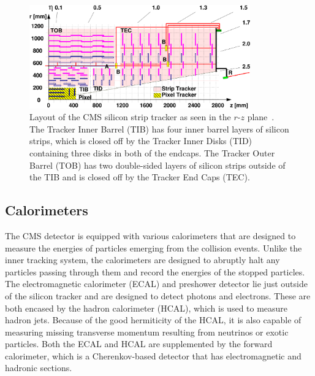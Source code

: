 \begin{figure}[htbp]
  \centering
  \includegraphics[width=0.85\textwidth]{fig/experiment/cms_siliconTracker.pdf}
  \caption[
    Layout of the CMS silicon strip tracker as seen in the $r$-$z$ plane.
    The Tracker Inner Barrel (TIB) has four inner barrel layers of silicon strips, which is closed off by the Tracker Inner Disks (TID) containing three disks in both of the endcaps.
    The Tracker Outer Barrel (TOB) has two double-sided layers of silicon strips outside of the TIB and is closed off by the Tracker End Caps (TEC).
  ]{
    Layout of the CMS silicon strip tracker as seen in the $r$-$z$ plane~\cite{Chatrchyan:1211825}.
    The Tracker Inner Barrel (TIB) has four inner barrel layers of silicon strips, which is closed off by the Tracker Inner Disks (TID) containing three disks in both of the endcaps.
    The Tracker Outer Barrel (TOB) has two double-sided layers of silicon strips outside of the TIB and is closed off by the Tracker End Caps (TEC).
  }
  \label{fig:CMSsilicon}
\end{figure}

\subsection{Calorimeters}
\label{subsec:calorimeter}

The CMS detector is equipped with various calorimeters that are designed to measure the energies of particles emerging from the collision events.
Unlike the inner tracking system, the calorimeters are designed to abruptly halt any particles passing through them and record the energies of the stopped particles.
The electromagnetic calorimeter (ECAL) and preshower detector lie just outside of the silicon tracker and are designed to detect photons and electrons.
These are both encased by the hadron calorimeter (HCAL), which is used to measure hadron jets.
Because of the good hermiticity of the HCAL, it is also capable of measuring missing transverse momentum resulting from neutrinos or exotic particles.
Both the ECAL and HCAL are supplemented by the forward calorimeter, which is a Cherenkov-based detector that has electromagnetic and hadronic sections.

